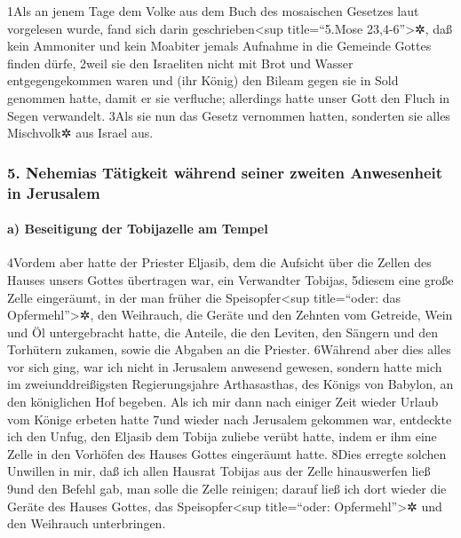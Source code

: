 1Als an jenem Tage dem Volke aus dem Buch des mosaischen Gesetzes laut
vorgelesen wurde, fand sich darin geschrieben\textless sup
title=``5.Mose 23,4-6''\textgreater✲, daß kein Ammoniter und kein
Moabiter jemals Aufnahme in die Gemeinde Gottes finden dürfe, 2weil sie
den Israeliten nicht mit Brot und Wasser entgegengekommen waren und (ihr
König) den Bileam gegen sie in Sold genommen hatte, damit er sie
verfluche; allerdings hatte unser Gott den Fluch in Segen verwandelt.
3Als sie nun das Gesetz vernommen hatten, sonderten sie alles Mischvolk✲
aus Israel aus.

\hypertarget{nehemias-tuxe4tigkeit-wuxe4hrend-seiner-zweiten-anwesenheit-in-jerusalem}{%
\subsubsection{5. Nehemias Tätigkeit während seiner zweiten Anwesenheit
in
Jerusalem}\label{nehemias-tuxe4tigkeit-wuxe4hrend-seiner-zweiten-anwesenheit-in-jerusalem}}

\hypertarget{a-beseitigung-der-tobijazelle-am-tempel}{%
\paragraph{a) Beseitigung der Tobijazelle am
Tempel}\label{a-beseitigung-der-tobijazelle-am-tempel}}

4Vordem aber hatte der Priester Eljasib, dem die Aufsicht über die
Zellen des Hauses unsers Gottes übertragen war, ein Verwandter Tobijas,
5diesem eine große Zelle eingeräumt, in der man früher die
Speisopfer\textless sup title=``oder: das Opfermehl''\textgreater✲, den
Weihrauch, die Geräte und den Zehnten vom Getreide, Wein und Öl
untergebracht hatte, die Anteile, die den Leviten, den Sängern und den
Torhütern zukamen, sowie die Abgaben an die Priester. 6Während aber dies
alles vor sich ging, war ich nicht in Jerusalem anwesend gewesen,
sondern hatte mich im zweiunddreißigsten Regierungsjahre Arthasasthas,
des Königs von Babylon, an den königlichen Hof begeben. Als ich mir dann
nach einiger Zeit wieder Urlaub vom Könige erbeten hatte 7und wieder
nach Jerusalem gekommen war, entdeckte ich den Unfug, den Eljasib dem
Tobija zuliebe verübt hatte, indem er ihm eine Zelle in den Vorhöfen des
Hauses Gottes eingeräumt hatte. 8Dies erregte solchen Unwillen in mir,
daß ich allen Hausrat Tobijas aus der Zelle hinauswerfen ließ 9und den
Befehl gab, man solle die Zelle reinigen; darauf ließ ich dort wieder
die Geräte des Hauses Gottes, das Speisopfer\textless sup title=``oder:
Opfermehl''\textgreater✲ und den Weihrauch unterbringen.

